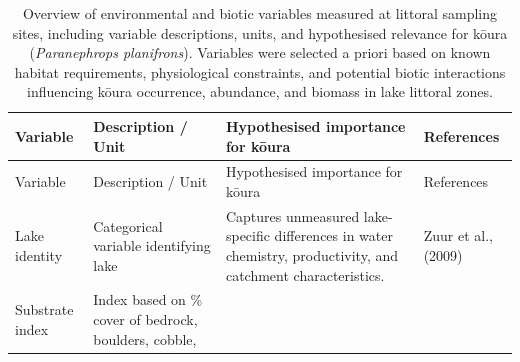 \documentclass[
  12pt,
  a4paper,
]{scrbook}
\begin{document}
\begin{longtable}[]{@{}
  >{\raggedright\arraybackslash}p{}
  >{\raggedright\arraybackslash}p{}
  >{\raggedright\arraybackslash}p{}
  >{\raggedright\arraybackslash}p{}@{}}
\caption{Overview of environmental and biotic variables measured at
littoral sampling sites, including variable descriptions, units, and
hypothesised relevance for kōura (\emph{Paranephrops planifrons}).
Variables were selected a priori based on known habitat requirements,
physiological constraints, and potential biotic interactions influencing
kōura occurrence, abundance, and biomass in lake littoral
zones.}\tabularnewline
\toprule\noalign{}
\begin{minipage}[b]{\linewidth}\raggedright
Variable
\end{minipage} & \begin{minipage}[b]{\linewidth}\raggedright
Description / Unit
\end{minipage} & \begin{minipage}[b]{\linewidth}\raggedright
Hypothesised importance for kōura
\end{minipage} & \begin{minipage}[b]{\linewidth}\raggedright
References
\end{minipage} \\
\midrule\noalign{}
\endfirsthead
\toprule\noalign{}
\begin{minipage}[b]{\linewidth}\raggedright
Variable
\end{minipage} & \begin{minipage}[b]{\linewidth}\raggedright
Description / Unit
\end{minipage} & \begin{minipage}[b]{\linewidth}\raggedright
Hypothesised importance for kōura
\end{minipage} & \begin{minipage}[b]{\linewidth}\raggedright
References
\end{minipage} \\
\midrule\noalign{}
\endhead
\bottomrule\noalign{}
\endlastfoot
Lake identity & Categorical variable identifying lake & Captures
unmeasured lake-specific differences in water chemistry, productivity,
and catchment characteristics. & Zuur et al., (2009) \\
Substrate index & Index based on \% cover of bedrock, boulders, cobble,

\end{longtable}
\end{document}
